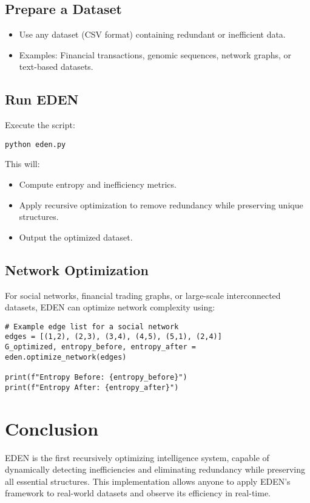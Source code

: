 \documentclass{article}
\begin{document}
\subsection{Prepare a Dataset}
\begin{itemize}
    \item Use any dataset (CSV format) containing redundant or inefficient data.
    \item Examples: Financial transactions, genomic sequences, network graphs, or text-based datasets.
\end{itemize}

\subsection{Run EDEN}
Execute the script:
\begin{verbatim}
python eden.py
\end{verbatim}
This will:
\begin{itemize}
    \item Compute entropy and inefficiency metrics.
    \item Apply recursive optimization to remove redundancy while preserving unique structures.
    \item Output the optimized dataset.
\end{itemize}

\subsection{Network Optimization}
For social networks, financial trading graphs, or large-scale interconnected datasets, EDEN can optimize network complexity using:
\begin{verbatim}
# Example edge list for a social network
edges = [(1,2), (2,3), (3,4), (4,5), (5,1), (2,4)]
G_optimized, entropy_before, entropy_after = eden.optimize_network(edges)

print(f"Entropy Before: {entropy_before}")
print(f"Entropy After: {entropy_after}")
\end{verbatim}

\section{Conclusion}

EDEN is the first recursively optimizing intelligence system, capable of dynamically detecting inefficiencies and eliminating redundancy while preserving all essential structures. This implementation allows anyone to apply EDEN’s framework to real-world datasets and observe its efficiency in real-time.
\end{document}
